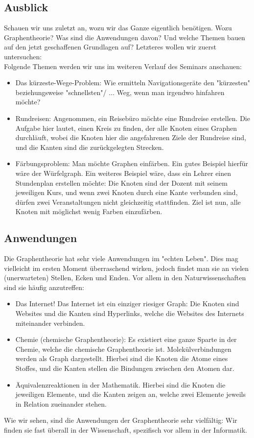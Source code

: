 \documentclass{article}
\begin{document}
\subsection{Ausblick}
Schauen wir uns zuletzt an, wozu wir das Ganze eigentlich benötigen. Wozu Graphentheorie? Was sind die Anwendungen davon? Und welche Themen bauen auf den jetzt geschaffenen Grundlagen auf? Letzteres wollen wir zuerst untersuchen:\\
Folgende Themen werden wir uns im weiteren Verlauf des Seminars anschauen:\\
\begin{itemize}
	\item{Das kürzeste-Wege-Problem: Wie ermitteln Navigationsgeräte den "kürzesten" beziehungsweise "schnellsten"/ $\ldots$ Weg, wenn man irgendwo hinfahren möchte?}
	\item{Rundreisen: Angenommen, ein Reisebüro möchte eine Rundreise erstellen. Die Aufgabe hier lautet, einen Kreis zu finden, der alle Knoten eines Graphen durchläuft, wobei die Knoten hier die angefahrenen Ziele der Rundreise sind, und die Kanten sind die zurückgelegten Strecken.}
	\item{Färbungsproblem: Man möchte Graphen einfärben. Ein gutes Beispiel hierfür wäre der Würfelgraph. Ein weiteres Beispiel wäre, dass ein Lehrer einen Stundenplan erstellen möchte: Die Knoten sind der Dozent mit seinem jeweiligen Kurs, und wenn zwei Knoten durch eine Kante verbunden sind, dürfen zwei Veranstaltungen nicht gleichzeitig stattfinden. Ziel ist nun, alle Knoten mit möglichst wenig Farben einzufärben.}
\end{itemize}

\subsection{Anwendungen}
Die Graphentheorie hat sehr viele Anwendungen im "echten Leben". Dies mag vielleicht im ersten Moment überraschend wirken, jedoch findet man sie an vielen (unerwarteten) Stellen, Ecken und Enden. Vor allem in den Naturwissenschaften sind sie häufig anzutreffen:\\
\begin{itemize}
	\item{Das Internet! Das Internet ist ein einziger riesiger Graph: Die Knoten sind Websites und die Kanten sind Hyperlinks, welche die Websites des Internets miteinander verbinden.}
	\item{Chemie (chemische Graphentheorie): Es existiert eine ganze Sparte in der Chemie, welche die chemische Graphentheorie ist. Molekülverbindungen werden als Graph dargestellt. Hierbei sind die Knoten die Atome eines Stoffes, und die Kanten stellen die Bindungen zwischen den Atomen dar.}
	\item{Äquivalenzreaktionen in der Mathematik. Hierbei sind die Knoten die jeweiligen Elemente, und die Kanten zeigen an, welche zwei Elemente jeweils in Relation zueinander stehen.}
\end{itemize}
Wie wir sehen, sind die Anwendungen der Graphentheorie sehr vielfältig: Wir finden sie fast überall in der Wissenschaft, spezifisch vor allem in der Informatik.\\
\end{document}
